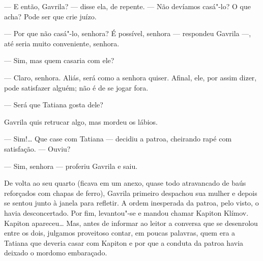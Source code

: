 --- E então, Gavrila? --- disse ela, de repente. --- Não devíamos
casá"-lo? O que acha? Pode ser que crie juízo.

--- Por que não casá"-lo, senhora? É possível, senhora --- respondeu
Gavrila ---, até seria muito conveniente, senhora.

--- Sim, mas quem casaria com ele?

--- Claro, senhora. Aliás, será como a senhora quiser. Afinal, ele, por
assim dizer, pode satisfazer alguém; não é de se jogar fora.

--- Será que Tatiana gosta dele?

Gavrila quis retrucar algo, mas mordeu os lábios.

--- Sim!\ldots{} Que case com Tatiana --- decidiu a patroa, cheirando rapé
com satisfação. --- Ouviu?

--- Sim, senhora --- proferiu Gavrila e saiu.

De volta ao seu quarto (ficava em um anexo, quase todo atravancado de
baús reforçados com chapas de ferro), Gavrila primeiro despachou sua
mulher e depois se sentou junto à janela para refletir. A ordem
inesperada da patroa, pelo visto, o havia desconcertado. Por fim,
levantou"-se e mandou chamar Kapiton Klímov. Kapiton apareceu\ldots{} Mas,
antes de informar ao leitor a conversa que se desenrolou entre os dois,
julgamos proveitoso contar, em poucas palavras, quem era a Tatiana que
deveria casar com Kapiton e por que a conduta da patroa havia deixado o
mordomo embaraçado.

